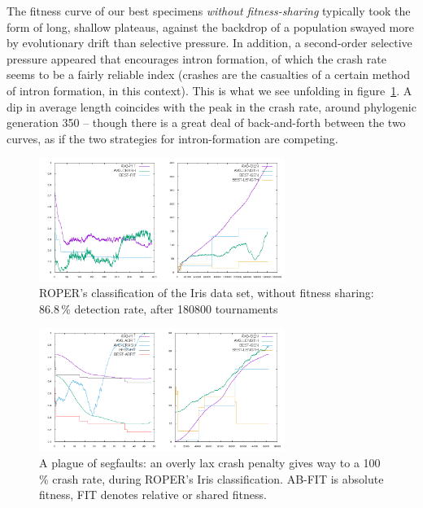 

The fitness curve of our best
specimens \textit{without fitness-sharing} typically took the form of long, shallow plateaus, against the backdrop of a population swayed more by evolutionary
drift than selective pressure.  In addition, a second-order selective pressure appeared that encourages intron formation,
of which the crash rate seems to be a fairly reliable index
(crashes are the casualties of a certain method of intron
formation, in this context). This is what we see unfolding in
figure~\ref{fig:good-nosharing}. A dip in average length coincides with the peak in the crash rate, around phylogenic generation 350 -- though there is a great deal of
back-and-forth between the two curves, as if the two strategies
for intron-formation are competing.%

\begin{figure}
  \includegraphics[height=4cm]{examples/iris/good-nosharing/good-nosharing.png}
  \caption{ROPER's classification of the Iris data set, without
  fitness sharing: 86.8\,\% detection rate, after 180800
  tournaments}
  \label{fig:good-nosharing}
\end{figure}

\begin{figure}
  \includegraphics[height=4cm]{examples/iris/plague/plague.png}
  \caption{A plague of segfaults: an overly lax crash penalty
  gives way to a 100\,\% crash rate, during ROPER's Iris
  classification. {AB-FIT} is absolute fitness,
  FIT denotes relative or shared fitness.}
  \label{fig:plague}
\end{figure}

